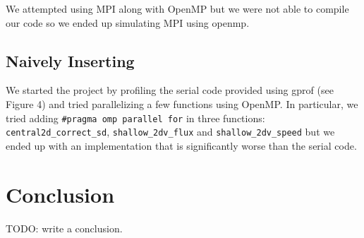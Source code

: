 \documentclass{article}
\begin{document}
We attempted using MPI along with OpenMP but we were not able to compile our code so we ended up simulating MPI using openmp. 

\subsection{Naively Inserting }

We started the project by profiling the serial code provided using gprof (see Figure 4) and tried parallelizing a few functions using OpenMP. In particular, we tried adding \texttt{\#pragma omp parallel for} in three functions: \texttt{central2d\_correct\_sd}, \texttt{shallow\_2dv\_flux} and \texttt{shallow\_2dv\_speed} but we ended up with an implementation that is significantly worse than the serial code.



\section{Conclusion}

TODO: write a conclusion.
\end{document}
